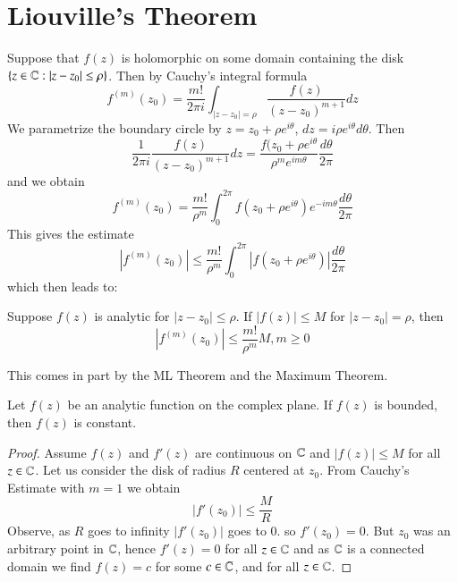 \documentclass[12pt, a4paper, oneside, openright, titlepage]{book}
\begin{document}
\section{Liouville's Theorem}


Suppose that $f(z)$ is holomorphic on some domain containing the disk $\{z \in \mathbb C:|z-z_0| \leq \rho\}$. Then by Cauchy's integral formula \begin{equation*}
    f^{(m)}(z_0) = \frac{m!}{2\pi i}\int_{|z-z_0|=\rho}\frac{f(z)}{(z-z_0)^{m+1}}dz
\end{equation*}
We parametrize the boundary circle by $z = z_0 + \rho e^{i\theta}$, $dz = i\rho e^{i\theta}d\theta$. Then \begin{equation*}
    \frac{1}{2\pi i}\frac{f(z)}{(z-z_0)^{m+1}}dz = \frac{f(z_0+\rho e^{i\theta}}{\rho^me^{im\theta}}\frac{d\theta}{2\pi}
\end{equation*}
and we obtain \begin{equation*}
    f^{(m)}(z_0) = \frac{m!}{\rho^m}\int_0^{2\pi}f(z_0+\rho e^{i\theta})e^{-im\theta}\frac{d\theta}{2\pi}
\end{equation*}
This gives the estimate \begin{equation*}
    \left|f^{(m)}(z_0)\right| \leq \frac{m!}{\rho^m}\int_{0}^{2\pi}|f(z_0+\rho e^{i\theta})|\frac{d\theta}{2\pi}
\end{equation*}
which then leads to: 

\begin{thm}
    Suppose $f(z)$ is analytic for $|z-z_0| \leq \rho$. If $|f(z)| \leq M$ for $|z - z_0| = \rho$, then \begin{equation*}
        \left|f^{(m)}(z_0)\right| \leq \frac{m!}{\rho^m}M, m \geq 0 
    \end{equation*}
\end{thm}

This comes in part by the ML Theorem and the Maximum Theorem.

\begin{namthm}
    Let $f(z)$ be an analytic function on the complex plane. If $f(z)$ is bounded, then $f(z)$ is constant.
\end{namthm}
\begin{proof}
    Assume $f(z)$ and $f'(z)$ are continuous on $\mathbb C$ and $|f(z)| \leq M$ for all $z \in \mathbb C$. Let us consider the disk of radius $R$ centered at $z_0$. From Cauchy's Estimate with $m = 1$ we obtain \begin{equation*}
        |f'(z_0)| \leq \frac{M}{R}
    \end{equation*}
    Observe, as $R$ goes to infinity $|f'(z_0)|$ goes to $0$. so $f'(z_0) = 0$. But $z_0$ was an arbitrary point in $\mathbb C$, hence $f'(z) = 0$ for all $z \in \mathbb C$ and as $\mathbb C$ is a connected domain we find $f(z) = c$ for some $c \in \mathbb C$, and for all $z \in \mathbb C$.
\end{proof}
\end{document}
